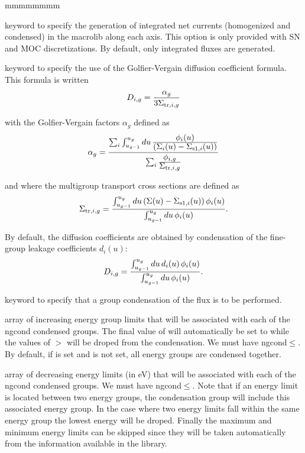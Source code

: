 \begin{ListeDeDescription}{mmmmmmmm}
\item[\moc{EDI\_CURR}] keyword to specify the generation of integrated net currents (homogenized and condensed) in the macrolib along each axis.
This option is only provided with SN and MOC discretizations. By default, only integrated fluxes are generated.

\item[\moc{GOLVER}] keyword to specify the use of the Golfier-Vergain diffusion coefficient formula. This formula is written
$$D_{i,g}={\alpha_g\over 3\Sigma_{{\rm tr},i,g}}$$

\noindent with the Golfier-Vergain factors $\alpha_g$ defined as
$$\alpha_g={\sum_i  \int_{u_{g-1}}^{u_g} du \, {\displaystyle\phi_i(u) \over \displaystyle\left(\Sigma_i(u)-\Sigma_{{\rm s1},i}(u) \right) }
\over \sum_i {\displaystyle\phi_{i,g} \over \displaystyle\Sigma_{{\rm tr},i,g}} }$$

and where the multigroup transport cross sections are defined as
$$\Sigma_{{\rm tr},i,g}={\int_{u_{g-1}}^{u_g} du \left(\Sigma(u) -\Sigma_{{\rm s1},i}(u) \right) \phi_i(u)
\over \int_{u_{g-1}}^{u_g} du \, \phi_i(u) }.$$

By default, the diffusion coefficients are obtained by condensation of the fine-group leakage coefficients $d_i(u)$:
$$D_{i,g}={\int_{u_{g-1}}^{u_g} du \, d_i(u) \, \phi_i(u) \over \int_{u_{g-1}}^{u_g} du \, \phi_i(u) }.$$

\item[\moc{COND}] keyword to specify that a group condensation of the flux is to be performed.

\item[\dusa{icond}] array of increasing energy group limits that will be associated with
each of the ngcond condensed groups. The final value of
 will automatically be set to  while the values of 
$>$ will be droped from the condensation. 
We must have ngcond$\le$. By default, if  is set and 
is not set, all energy groups are condensed together.

\item[\dusa{energy}] array of decreasing energy limits (in eV) that will be
associated with each of the ngcond condensed groups. We must have ngcond$\le$. 
Note that if an energy limit is located between two energy groups, the condensation
group will include this associated energy group. In the case where two energy
limits fall within the same energy group the lowest energy will be droped.
Finally the maximum and minimum energy limits can be skipped since they will be
taken automatically from the information available in the library.


\end{ListeDeDescription}

